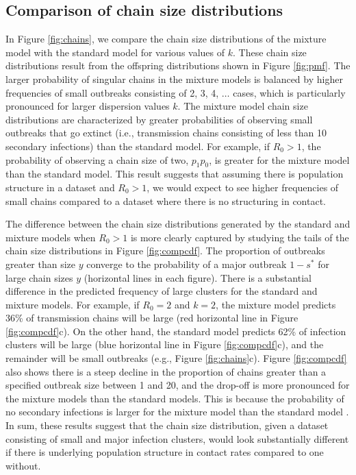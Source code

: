 \documentclass{imammb}
\numberwithin{equation}{section}
\begin{document}
\subsection{Comparison of chain size distributions}



In Figure \ref{fig:chains}, we compare the chain size distributions of the mixture model with the standard model for various values of $k$. These chain size distributions result from the offspring distributions shown in Figure \ref{fig:pmf}.  The larger probability of singular chains in the mixture models is balanced by higher frequencies of small outbreaks consisting of 2, 3, 4, $\dots$ cases, which is particularly pronounced for larger dispersion values $k$. The mixture model chain size distributions are characterized by greater probabilities of observing small outbreaks that go extinct (i.e., transmission chains consisting of less than 10 secondary infections) than the standard model. For example, if $R_0 > 1$, the probability of observing a chain size of two, $p_1 p_0$, is greater for the mixture model than the standard model. This result suggests that assuming there is population structure in a dataset and $R_0>1$, we would expect to see higher frequencies of small chains compared to a dataset where there is no structuring in contact. %

The difference between the chain size distributions generated by the standard and mixture models when $R_0>1$ is more clearly captured by studying the tails of the chain size distributions in  Figure \ref{fig:compcdf}. The proportion of outbreaks greater than size $y$  converge to the probability of a major outbreak $1-s^*$ for large chain sizes $y$ (horizontal lines in each figure). There is a substantial difference in the predicted frequency of large clusters for the standard and mixture models.
For example, if $R_0=2$ and $k=2$, the mixture model predicts 36\% of transmission chains will be large (red horizontal line in  Figure \ref{fig:compcdf}c). On the other hand, the standard model predicts 62\% of infection clusters will be large (blue horizontal line in  Figure \ref{fig:compcdf}c), and the remainder will be small outbreaks (e.g., Figure \ref{fig:chains}c). Figure \ref{fig:compcdf} also shows there is a steep decline in the proportion of chains greater than a specified outbreak size between 1 and 20, and the drop-off is more pronounced for the mixture models than the standard models. This is because the probability of no secondary infections is larger for the mixture model than the standard model \citep{Garske2008-ax}.  In sum, these results suggest that the chain size distribution, given a dataset consisting of small and major infection clusters, would look substantially different if there is underlying population structure in contact rates compared to one without. %
\end{document}
